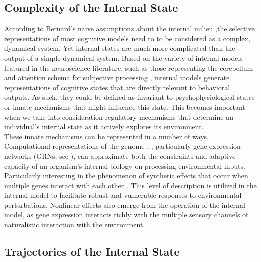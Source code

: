 \documentclass{sigchi}
\begin{document}
\subsection{Complexity of the Internal State}
According to Bernard’s naive assumptions about the internal milieu \cite{Ashby:1960:DFB},the selective representations of most cognitive models need to to be considered as a complex, dynamical system. Yet internal states are much more complicated than the output of a simple dynamical system. Based on the variety of internal models featured in the neuroscience literature, such as those representing the cerebellum \cite{wolpert} and attention schema for subjective processing \cite{graziano}, internal models generate representations of cognitive states that are directly relevant to behavioral outputs. As such, they could be defined as invariant to psychophysiological states or innate mechanisms that might influence this state. This becomes important when we take into consideration regulatory mechanisms that determine an individual’s internal state as it actively explores its environment. \\
These innate mechanisms can be represented in a number of ways. Computational representations of the genome \cite{albert}, \cite{aguilar}, particularly gene expression networks (GRNs, see \cite{cussat}), can approximate both the constraints and adaptive capacity of an organism’s internal biology on processing environmental inputs. Particularly interesting in the phenomenon of synthetic effects that occur when multiple genes interact with each other \cite{sanford}. This level of description is utilized in the internal model to facilitate robust and vulnerable responses to environmental perturbations. Nonlinear effects also emerge from the operation of the internal model, as gene expression interacts richly with the multiple sensory channels of naturalistic interaction with the environment.   


\subsection{Trajectories of the Internal State}
\end{document}
